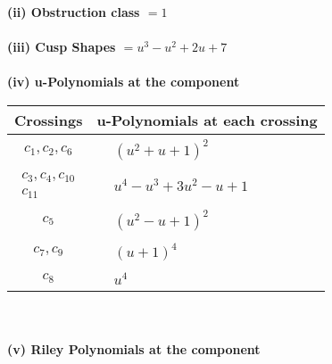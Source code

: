 \documentclass[1p]{elsarticle_modified}
\theoremstyle{definition}
\begin{document}
\flushleft \textbf{(ii) Obstruction class $= 1$}\\~\\
\flushleft \textbf{(iii) Cusp Shapes $= u^3- u^2+2 u+7$}\\~\\
\newpage\renewcommand{\arraystretch}{1}
\flushleft \textbf{(iv) u-Polynomials at the component}\newline \\
\begin{tabular}{m{50pt}|m{274pt}}
Crossings & \hspace{64pt}u-Polynomials at each crossing \\
\hline $$\begin{aligned}c_{1},c_{2},c_{6}\end{aligned}$$&$\begin{aligned}
&(u^2+u+1)^2
\end{aligned}$\\
\hline $$\begin{aligned}c_{3},c_{4},c_{10}\\c_{11}\end{aligned}$$&$\begin{aligned}
&u^4- u^3+3 u^2- u+1
\end{aligned}$\\
\hline $$\begin{aligned}c_{5}\end{aligned}$$&$\begin{aligned}
&(u^2- u+1)^2
\end{aligned}$\\
\hline $$\begin{aligned}c_{7},c_{9}\end{aligned}$$&$\begin{aligned}
&(u+1)^4
\end{aligned}$\\
\hline $$\begin{aligned}c_{8}\end{aligned}$$&$\begin{aligned}
&u^4
\end{aligned}$\\
\hline
\end{tabular}\\~\\
\newpage\renewcommand{\arraystretch}{1}
\flushleft \textbf{(v) Riley Polynomials at the component}\newline \\
\end{document}
